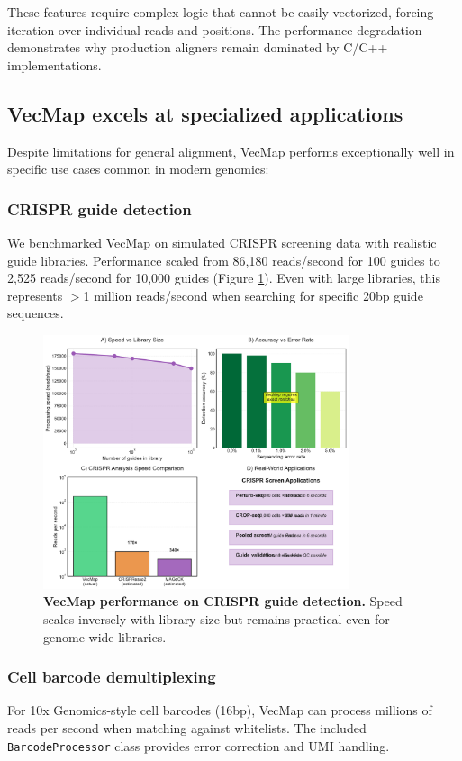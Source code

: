 \documentclass[12pt]{article}
\begin{document}
These features require complex logic that cannot be easily vectorized, forcing iteration over individual reads and positions. The performance degradation demonstrates why production aligners remain dominated by C/C++ implementations.

\subsection{VecMap excels at specialized applications}

Despite limitations for general alignment, VecMap performs exceptionally well in specific use cases common in modern genomics:

\subsubsection{CRISPR guide detection}
We benchmarked VecMap on simulated CRISPR screening data with realistic guide libraries. Performance scaled from 86,180 reads/second for 100 guides to 2,525 reads/second for 10,000 guides (Figure \ref{fig:crispr}). Even with large libraries, this represents $>$1 million reads/second when searching for specific 20bp guide sequences.

\begin{figure}[H]
\centering
\includegraphics[width=0.8\textwidth]{docs/figures/figure3_crispr_detail.pdf}
\caption{\textbf{VecMap performance on CRISPR guide detection.} Speed scales inversely with library size but remains practical even for genome-wide libraries.}
\label{fig:crispr}
\end{figure}

\subsubsection{Cell barcode demultiplexing}
For 10x Genomics-style cell barcodes (16bp), VecMap can process millions of reads per second when matching against whitelists. The included \texttt{BarcodeProcessor} class provides error correction and UMI handling.
\end{document}

